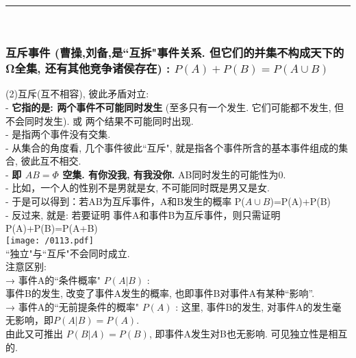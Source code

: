\documentclass[UTF8]{ctexart}
\begin{document}
	
	
	~\\
	\hrule
	~\\
	
	
	\subsubsection{互斥事件 (曹操,刘备,是``互拆"事件关系. 但它们的并集不构成天下的Ω全集, 还有其他竞争诸侯存在) : $P(A)+P(B)=P(A \cup B)$}
	
	(2)互斥(互不相容), 彼此矛盾对立: \\
	- \textbf{它指的是: 两个事件不可能同时发生} (至多只有一个发生. 它们可能都不发生, 但不会同时发生). 或 两个结果不可能同时出现. \\
	-  是指两个事件没有交集. \\
	- 从集合的角度看, 几个事件彼此``互斥", 就是指各个事件所含的基本事件组成的集合, 彼此互不相交. \\
	- \textbf{即 $ AB=\varPhi $ 空集.  有你没我, 有我没你.} AB同时发生的可能性为0. \\
	- 比如，一个人的性别不是男就是女, 不可能同时既是男又是女. \\
	
	- 于是可以得到：若AB为互斥事件，A和B发生的概率 P($A \cup B$)=P(A)+P(B) \\
	- 反过来, 就是: 若要证明 事件A和事件B为互斥事件，则只需证明 P(A)+P(B)=P(A+B) \\
	
	
	\texttt{[image: /0113.pdf]} \\
	
	
	``独立"与``互斥"不会同时成立. \\
	
	
	
	
	注意区别:	\\
	→ 事件A的``条件概率" $P(A|B)$ :  \\
	事件B的发生, 改变了事件A发生的概率, 也即事件B对事件A有某种``影响”. \\
	
	→ 事件A的``无前提条件的概率" $P(A)$ : 这里, 事件B的发生, 对事件A的发生毫无影响，即$ P(A|B)=P(A)$.  \\
	由此又可推出 $ P(B|A)=P(B)$, 即事件A发生对B也无影响. 可见独立性是相互的.  \\
	
\end{document}
